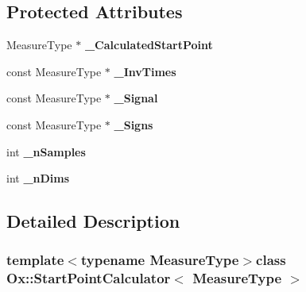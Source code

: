 \subsection*{Protected Attributes}
\begin{DoxyCompactItemize}
\item 
\hypertarget{class_ox_1_1_start_point_calculator_a90c26143db22a371533de08a87cdada0}{Measure\-Type $\ast$ {\bfseries \-\_\-\-Calculated\-Start\-Point}}\label{class_ox_1_1_start_point_calculator_a90c26143db22a371533de08a87cdada0}

\item 
\hypertarget{class_ox_1_1_start_point_calculator_a64929ca24726ddf99017b6f18cc03e29}{const Measure\-Type $\ast$ {\bfseries \-\_\-\-Inv\-Times}}\label{class_ox_1_1_start_point_calculator_a64929ca24726ddf99017b6f18cc03e29}

\item 
\hypertarget{class_ox_1_1_start_point_calculator_ae947a684f4a2cb29c36786490c9ca0b8}{const Measure\-Type $\ast$ {\bfseries \-\_\-\-Signal}}\label{class_ox_1_1_start_point_calculator_ae947a684f4a2cb29c36786490c9ca0b8}

\item 
\hypertarget{class_ox_1_1_start_point_calculator_abce7ef554368d8739ac27dddb63382df}{const Measure\-Type $\ast$ {\bfseries \-\_\-\-Signs}}\label{class_ox_1_1_start_point_calculator_abce7ef554368d8739ac27dddb63382df}

\item 
\hypertarget{class_ox_1_1_start_point_calculator_a17601c059cd679301597bc897e297c2f}{int {\bfseries \-\_\-n\-Samples}}\label{class_ox_1_1_start_point_calculator_a17601c059cd679301597bc897e297c2f}

\item 
\hypertarget{class_ox_1_1_start_point_calculator_a1bee9378aff7741838dad45ff6d5dc1d}{int {\bfseries \-\_\-n\-Dims}}\label{class_ox_1_1_start_point_calculator_a1bee9378aff7741838dad45ff6d5dc1d}

\end{DoxyCompactItemize}


\subsection{Detailed Description}
\subsubsection*{template$<$typename Measure\-Type$>$class Ox\-::\-Start\-Point\-Calculator$<$ Measure\-Type $>$}



